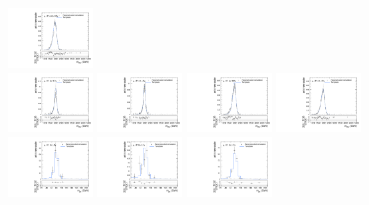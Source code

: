 \begin{figure}[htpb]
  \includegraphics[width=0.2\textwidth]{fig/2Dfit/templateVsReco_VBFZprToWW2000_r0_MVV_mu_LP_nobb_HDy_linear.pdf}\\
  \includegraphics[width=0.2\textwidth]{fig/2Dfit/templateVsReco_VBFZprToWW2000_r0_MVV_mu_HP_vbf_LDy_linear.pdf}
  \includegraphics[width=0.2\textwidth]{fig/2Dfit/templateVsReco_VBFZprToWW2000_r0_MVV_mu_LP_vbf_LDy_linear.pdf}
  \includegraphics[width=0.2\textwidth]{fig/2Dfit/templateVsReco_VBFZprToWW2000_r0_MVV_mu_HP_vbf_HDy_linear.pdf}
  \includegraphics[width=0.2\textwidth]{fig/2Dfit/templateVsReco_VBFZprToWW2000_r0_MVV_mu_LP_vbf_HDy_linear.pdf}\\
  \includegraphics[width=0.2\textwidth]{fig/2Dfit/templateVsReco_VBFZprToWW2000_r0_MJ_mu_HP_bb_LDy.pdf}
  \includegraphics[width=0.2\textwidth]{fig/2Dfit/templateVsReco_VBFZprToWW2000_r0_MJ_mu_LP_bb_LDy.pdf}
  \includegraphics[width=0.2\textwidth]{fig/2Dfit/templateVsReco_VBFZprToWW2000_r0_MJ_mu_HP_bb_HDy.pdf}

\end{figure}
